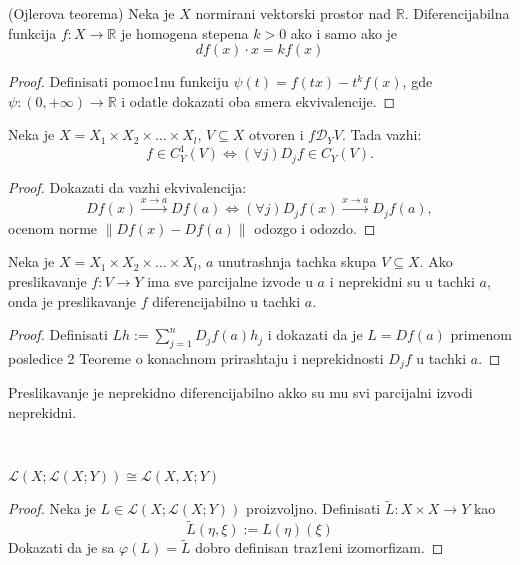 \documentclass[a4paper,12pt]{article}
\newcommand{\R}{\mathbb{R}}
\newcommand{\RR}{\mathbb{R}}
\newcommand{\psj}{\subseteq}
\newcommand{\ds}{\displaystyle}
\newcommand{\norm}[1]{\left\lVert#1\right\rVert}
\begin{document}
\begin{tma}
(Ojlerova teorema) Neka je $X$ normirani vektorski prostor nad $\R$. Di\-fe\-ren\-ci\-ja\-bil\-na funkcija $f: X \to \R$ je homogena stepena $k>0$ ako i samo ako je \[df(x) \cdot x = k f(x)\]
\end{tma}
\begin{proof}
	Definisati pomoc1nu funkciju $\psi (t) = f(tx) - t^kf(x)$, gde $\psi:(0, +\infty) \to \RR$ i odatle dokazati oba smera ekvivalencije. 
\end{proof}


\begin{tvr}
	Neka je $X = X_1\times X_2\times \dotso \times X_l$, $V\psj X$ otvoren i $f\mathcal D_Y V$. Tada vazhi:
	\[ f \in C^1_Y(V) \iff (\forall j) D_j f \in C_Y(V) .\] 
\end{tvr}
\begin{proof}
	Dokazati da vazhi ekvivalencija:
	\[ Df(x) \overset{x\to a}{\longrightarrow} Df(a) \iff (\forall j)D_jf(x) \overset{x\to a}{\longrightarrow} D_jf(a) ,\] 
	ocenom norme $\norm{Df(x) - Df(a)}$ odozgo i odozdo.
\end{proof}

\begin{tma}
		Neka je $X = X_1\times X_2\times \dotso \times X_l$,  $a$ unutrashnja tachka skupa $V\psj X$. Ako preslikavanje $f:V\to Y$
		ima sve parcijalne izvode u $a$ i neprekidni su u tachki $a$, onda je preslikavanje $f$ diferencijabilno u tachki $a$.
\end{tma}
\begin{proof}
	Definisati $\ds{Lh := \sum_{j=1}^n D_jf(a)h_j}$ i dokazati da je $L = Df(a)$ primenom posledice 2 Teoreme o konachnom prirashtaju i 
	neprekidnosti $D_jf$ u tachki $a$.
\end{proof}

\begin{posl}
	Preslikavanje je neprekidno diferencijabilno akko su mu svi parcijalni izvodi neprekidni.
\end{posl}\\


\begin{tvr}
$\mathcal{L} (X; \mathcal{L}(X;Y)) \cong \mathcal{L} (X,X; Y)$
\end{tvr}
\begin{proof}
Neka je $L \in \mathcal{L} (X; \mathcal{L}(X;Y))$ proizvoljno. Definisati $\tilde{L} : X \times X \to Y$ kao \[\tilde{L} (\eta, \xi) := L(\eta)(\xi)\]
Dokazati da je sa $\varphi(L) = \tilde{L}$ dobro definisan traz1eni izomorfizam.
\end{proof}
\end{document}
